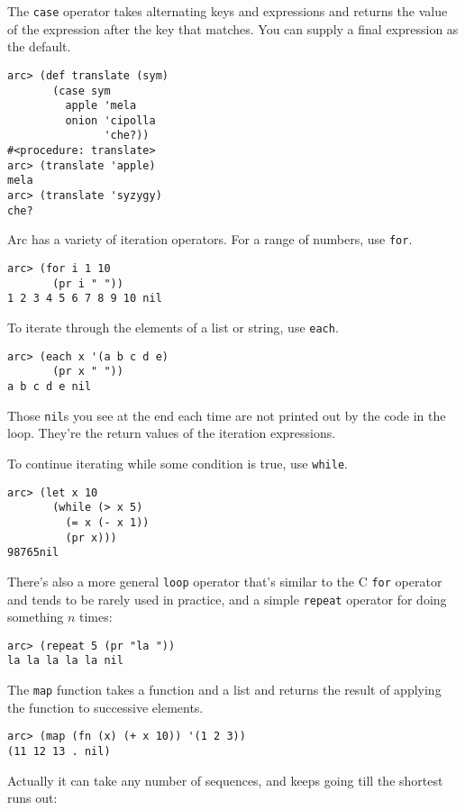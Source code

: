 \documentclass[a4paper,12pt]{book}
\begin{document}
The \verb|case| operator takes alternating keys and expressions and returns
the value of the expression after the key that matches.  You can
supply a final expression as the default.

\begin{verbatim}
arc> (def translate (sym)
       (case sym
         apple 'mela 
         onion 'cipolla
               'che?))
#<procedure: translate>
arc> (translate 'apple)
mela
arc> (translate 'syzygy)
che?
\end{verbatim}

{\sc{}Arc} has a variety of iteration operators.  For a range of numbers,
use \verb|for|.

\begin{verbatim}
arc> (for i 1 10 
       (pr i " "))
1 2 3 4 5 6 7 8 9 10 nil
\end{verbatim}

To iterate through the elements of a list or string, use \verb|each|.

\begin{verbatim}
arc> (each x '(a b c d e) 
       (pr x " "))
a b c d e nil
\end{verbatim}

Those \verb|nil|s you see at the end each time are not printed out by the
code in the loop.  They're the return values of the iteration
expressions.

To continue iterating while some condition is true, use \verb|while|.

\begin{verbatim}
arc> (let x 10
       (while (> x 5)
         (= x (- x 1))
         (pr x)))
98765nil
\end{verbatim}

There's also a more general \verb|loop| operator that's similar to the C
\verb|for| operator and tends to be rarely used in practice, and a simple
\verb|repeat| operator for doing something $n$ times:

\begin{verbatim}
arc> (repeat 5 (pr "la "))
la la la la la nil
\end{verbatim}

The \verb|map| function takes a function and a list and returns the result
of applying the function to successive elements.

\begin{verbatim}
arc> (map (fn (x) (+ x 10)) '(1 2 3))
(11 12 13 . nil)
\end{verbatim}

Actually it can take any number of sequences, and keeps going till
the shortest runs out:
\end{document}
